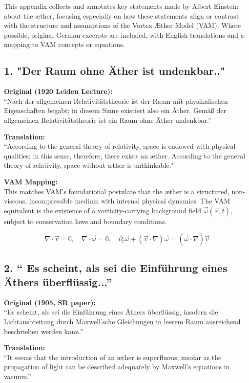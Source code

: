This appendix collects and annotates key statements made by Albert Einstein about the æther, focusing especially on how these statements align or contrast with the structure and assumptions of the Vortex Æther Model (VAM). Where possible, original German excerpts are included, with English translations and a mapping to VAM concepts or equations.

\subsection*{1. "Der Raum ohne Äther ist undenkbar.."}
\textbf{Original (1920 Leiden Lecture):} \\
``Nach der allgemeinen Relativitätstheorie ist der Raum mit physikalischen Eigenschaften begabt; in diesem Sinne existiert also ein Äther. Gemäß der allgemeinen Relativitätstheorie ist ein Raum ohne Äther undenkbar.''

\textbf{Translation:} \\
``According to the general theory of relativity, space is endowed with physical qualities; in this sense, therefore, there exists an æther. According to the general theory of relativity, space without æther is unthinkable.''

\textbf{VAM Mapping:} \\
This matches VAM's foundational postulate that the æther is a structured, non-viscous, incompressible medium with internal physical dynamics. The VAM equivalent is the existence of a vorticity-carrying background field \( \vec{\omega}(\vec{r}, t) \), subject to conservation laws and boundary conditions.

\[
\nabla \cdot \vec{v} = 0, \quad \nabla \cdot \vec{\omega} = 0, \quad \partial_t \vec{\omega} + (\vec{v} \cdot \nabla) \vec{\omega} = (\vec{\omega} \cdot \nabla) \vec{v}
\]

\subsection*{2. `` Es scheint, als sei die Einführung eines Äthers überflüssig...''}
\textbf{Original (1905, SR paper):} \\
``Es scheint, als sei die Einführung eines Äthers überflüssig, insofern die Lichtausbreitung durch Maxwell'sche Gleichungen in leerem Raum ausreichend beschrieben werden kann.''

\textbf{Translation:} \\
``It seems that the introduction of an æther is superfluous, insofar as the propagation of light can be described adequately by Maxwell's equations in vacuum.''

